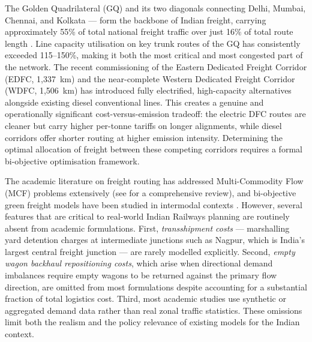\documentclass[11pt, a4paper]{article}
\numberwithin{equation}{section}
\numberwithin{figure}{section}
\numberwithin{table}{section}
\begin{document}
The Golden Quadrilateral (GQ) and its two diagonals connecting Delhi, Mumbai,
Chennai, and Kolkata — form the backbone of Indian freight, carrying approximately 55\%
of total national freight traffic over just 16\% of total route length \cite{dfccil2023}.
Line capacity utilisation on key trunk routes of the GQ has consistently exceeded
115--150\%, making it both the most critical and most congested part of the network.
The recent commissioning of the Eastern Dedicated Freight Corridor (EDFC, 1,337~km) and
the near-complete Western Dedicated Freight Corridor (WDFC, 1,506~km) has introduced
fully electrified, high-capacity alternatives alongside existing diesel conventional
lines. This creates a genuine and operationally significant cost-versus-emission tradeoff:
the electric DFC routes are cleaner but carry higher per-tonne tariffs on longer
alignments, while diesel corridors offer shorter routing at higher emission intensity.
Determining the optimal allocation of freight between these competing corridors requires
a formal bi-objective optimisation framework.

The academic literature on freight routing has addressed Multi-Commodity Flow (MCF)
problems extensively (see \cite{malladi2020} for a comprehensive review), and bi-objective
green freight models have been studied in intermodal contexts \cite{demir2019}. However,
several features that are critical to real-world Indian Railways planning are routinely
absent from academic formulations. First, \textit{transshipment costs} — marshalling yard
detention charges at intermediate junctions such as Nagpur, which is India's largest
central freight junction — are rarely modelled explicitly. Second, \textit{empty wagon
backhaul repositioning costs}, which arise when directional demand imbalances require
empty wagons to be returned against the primary flow direction, are omitted from most
formulations despite accounting for a substantial fraction of total logistics cost. Third,
most academic studies use synthetic or aggregated demand data rather than real zonal
traffic statistics. These omissions limit both the realism and the policy relevance of
existing models for the Indian context.
\end{document}
